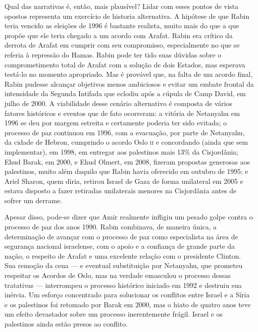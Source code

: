 Qual das narrativas é, então, mais plausível? Lidar com esses pontos de
vista opostos representa um exercício de historia alternativa. A
hipótese de que Rabin teria vencido as eleições de 1996 é bastante
realista, muito mais do que a que propõe que ele teria chegado a um acordo
com Arafat. Rabin era crítico da derrota de Arafat em cumprir com seu
compromisso, especialmente no que se referia à repressão do Hamas.
Rabin pode ter tido suas dúvidas sobre o comprometimento total de Arafat
com a solução de dois Estados, mas esperava testá-lo no momento
apropriado. Mas é provável que, na falta de um acordo final, Rabin
pudesse alcançar objetivos menos ambiciosos e evitar um embate frontal da
intensidade da Segunda Intifada que eclodiu após a cúpula de Camp David,
em julho de 2000. A viabilidade desse cenário alternativo é composta de
vários fatores históricos e eventos que de fato ocorreram: a vitória de
Netanyahu em 1996 se deu por margem estreita e certamente poderia ter sido
evitada; o processo de paz continuou em 1996, com a evacuação, por parte
de Netanyahu, da cidade de Hebron, cumprindo o acordo Oslo \textsc{ii} e
concordando (ainda que sem implementar), em 1998, em entregar aos palestinos
mais 13\% da Cisjordânia; Ehud Barak, em 2000, e Ehud Olmert, em 2008,
fizeram propostas generosas aos palestinos, muito além daquilo que Rabin
havia oferecido em outubro de 1995; e Ariel Sharon, quem diria, retirou
Israel de Gaza de forma unilateral em 2005 e estava disposto a fazer
retiradas unilaterais menores na Cisjordânia antes de sofrer um derrame.

Apesar disso, pode-se dizer que Amir realmente infligiu um pesado
golpe contra o processo de paz dos anos 1990. Rabin combinava, de
maneira única, a determinação de avançar com o processo de paz como
especialista na área de segurança nacional israelense, com o apoio e a
confiança de grande parte da nação, o respeito de Arafat e
uma excelente relação com o presidente Clinton. Sua remoção da cena --- e
eventual substituição por Netanyahu, que prometeu respeitar os Acordos
de Oslo, mas na verdade emasculou o processo dessas tratativas --- interrompeu o
processo histórico iniciado em 1992 e destruiu sua inércia. Um esforço
concentrado para solucionar os conflitos entre Israel e a Síria e os
palestinos foi retomado por Barak em 2000, mas o hiato de quatro anos
teve um efeito devastador sobre um processo inerentemente frágil. Israel
e os palestinos ainda estão presos ao conflito.

